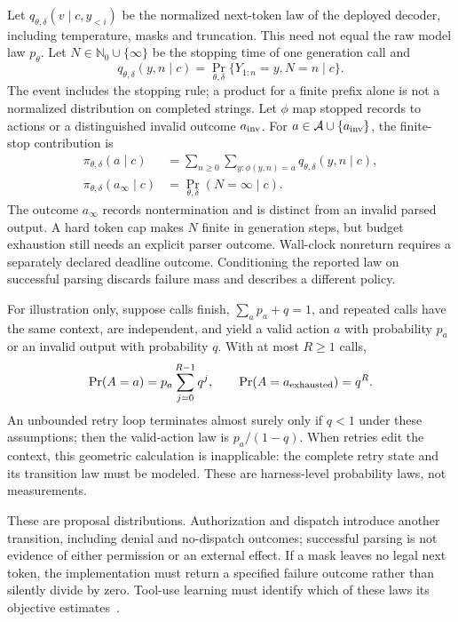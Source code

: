 Let $q_{\theta,\delta}(v\mid c,y_{<i})$ be the normalized next-token law of the deployed decoder, including temperature, masks and truncation. This need not equal the raw model law $p_\theta$. Let $N\in\mathbb N_0\cup\{\infty\}$ be the stopping time of one generation call and
\begin{equation}
 q_{\theta,\delta}(y,n\mid c)
 =\Pr_{\theta,\delta}\{Y_{1:n}=y,N=n\mid c\}.
\end{equation}
The event includes the stopping rule; a product for a finite prefix alone is not a normalized distribution on completed strings. Let $\phi$ map stopped records to actions or a distinguished invalid outcome $a_{\rm inv}$. For $a\in\mathcal A\cup\{a_{\rm inv}\}$, the finite-stop contribution is
\begin{equation}
\begin{aligned}
 \pi_{\theta,\delta}(a\mid c)
 &=\sum_{n\geq0}\sum_{y:\phi(y,n)=a}q_{\theta,\delta}(y,n\mid c),\\
 \pi_{\theta,\delta}(a_{\infty}\mid c)
 &=\Pr_{\theta,\delta}(N=\infty\mid c).
\end{aligned}
\end{equation}
The outcome $a_{\infty}$ records nontermination and is distinct from an invalid parsed output. A hard token cap makes $N$ finite in generation steps, but budget exhaustion still needs an explicit parser outcome. Wall-clock nonreturn requires a separately declared deadline outcome. Conditioning the reported law on successful parsing discards failure mass and describes a different policy.

For illustration only, suppose calls finish, $\sum_a p_a+q=1$, and repeated calls have the same context, are independent, and yield a valid action $a$ with probability $p_a$ or an invalid output with probability $q$. With at most $R\geq1$ calls,
\begin{equation}
 \Pr(A=a)=p_a\sum_{j=0}^{R-1}q^j,
 \qquad \Pr(A=a_{\rm exhausted})=q^R.
\end{equation}
An unbounded retry loop terminates almost surely only if $q<1$ under these assumptions; then the valid-action law is $p_a/(1-q)$. When retries edit the context, this geometric calculation is inapplicable: the complete retry state and its transition law must be modeled. These are harness-level probability laws, not measurements.

These are proposal distributions. Authorization and dispatch introduce another transition, including denial and no-dispatch outcomes; successful parsing is not evidence of either permission or an external effect. If a mask leaves no legal next token, the implementation must return a specified failure outcome rather than silently divide by zero. Tool-use learning must identify which of these laws its objective estimates~\cite{schick2023toolformer,yao2022react}.

